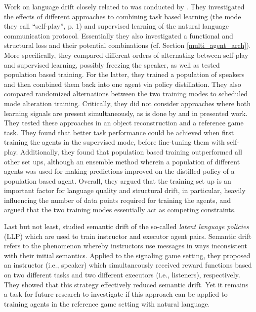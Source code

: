 Work on language drift closely related to \cite{lazaridou2020multi} was conducted by \cite{lowe2020interaction}. They investigated the effects of different approaches to combining task based learning (the mode they call ``self-play'', p. 1) and supervised learning of the natural language communication protocol. Essentially they also investigated a functional and structural loss and their potential combinations (cf. Section \ref{multi_agent_arch}). %
More specifically, they compared different orders of alternating between self-play and supervised learning, possibly freezing the speaker, as well as tested population based training. For the latter, they trained a population of speakers and then combined them back into one agent via policy distillation. They also compared randomized alternations between the two training modes to scheduled mode alteration training. 
Critically, they did not consider approaches where both learning signals are present simultaneously, as is done by \cite{lazaridou2020multi} and in presented work. They tested these approaches in an object reconstruction and a reference game task.
They found that better task performance could be achieved when first training the agents in the supervised mode, before fine-tuning them with self-play. Additionally, they found that population based training outperformed all other set ups, although an ensemble method wherein a population of different agents was used for making predictions improved on the distilled policy of a population based agent. Overall, they argued that the training set up is an important factor for language quality and structural drift, in particular, heavily influencing the number of data points required for training the agents, and argued that the two training modes essentially act as competing constraints.  

Last but not least, \cite{jacob2021multitasking} studied semantic drift of the so-called \textit{latent language policies} (LLP) which are used to train instructor and executor agent pairs. Semantic drift refers to the phenomenon whereby instructors use messages in ways inconsistent with their initial semantics. Applied to the signaling game setting, they proposed an instructor (i.e., speaker) which simultaneously received reward functions based on two different tasks and two different executors (i.e., listeners), respectively. They showed that this strategy effectively reduced semantic drift. Yet it remains a task for future research to investigate if this approach can be applied to training agents in the reference game setting with natural language.

